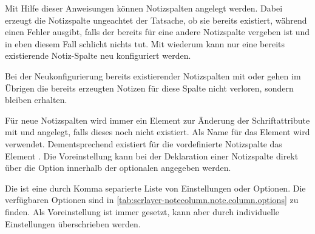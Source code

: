 \begin{Declaration}
\end{Declaration}
Mit Hilfe dieser Anweisungen können Notizspalten angelegt werden. Dabei
erzeugt  die Notizspalte ungeachtet der Tatsache, ob
sie bereits existiert, während  einen
Fehler ausgibt, falls der  bereits für eine andere
Notizspalte vergeben ist und  in eben diesem Fall
schlicht nichts tut. Mit  wiederum kann nur eine
bereits existierende Notiz-Spalte neu konfiguriert werden.

Bei der Neukonfigurierung bereits existierender Notizspalten mit
 oder  gehen im Übrigen
die bereits erzeugten Notizen für diese Spalte nicht verloren, sondern bleiben
erhalten.

%
%
Für neue Notizspalten wird immer ein Element zur Änderung der Schriftattribute
mit  und  angelegt,
falls dieses noch nicht existiert. Als Name für das Element wird
 verwendet. Dementsprechend
existiert für die vordefinierte Notizspalte  das
Element . Die
Voreinstellung kann bei der Deklaration einer Notizspalte direkt über die
Option  innerhalb der optionalen 
angegeben werden.%
%
%

Die  ist eine durch Komma separierte Liste von
Einstellungen oder Optionen. Die verfügbaren Optionen sind in
\autoref{tab:scrlayer-notecolumn.note.column.options} %
\iffalse %
\unskip, \autopageref{tab:scrlayer-notecolumn.note.column.options} %
\fi%
zu finden. Als
Voreinstellung ist  immer gesetzt, kann aber durch
individuelle Einstellungen überschrieben werden.


